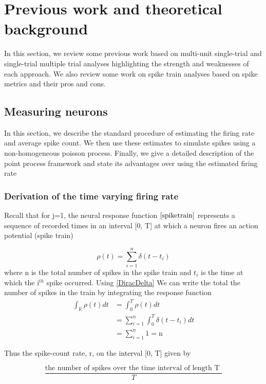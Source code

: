 
\section{Previous work and theoretical background}
In this section, we review some previous work based on multi-unit single-trial
and single-trial multiple trial analyses highlighting the strength and
weaknesses of each approach.
We also review some work on spike train analyses based on spike metrics
and their pros and cons.
\subsection{Measuring neurons}
In this section, we describe the standard procedure of estimating the 
firing rate and average spike count. We then use these estimates
to simulate spikes using a non-homogeneous poisson process.
Finally, we give a detailed description of the point process framework and 
state its advantages over using the estimated firing rate

\subsubsection{Derivation of the time varying firing rate}
Recall that for j=1, the neural response function $\eqref{spiketrain}$ represents a sequence of recorded times in an interval [0, T] at which a neuron fires an action potential (spike train)

\begin{equation}\label{response function}
 \rho(t) = \sum_{i=1}^{n} \delta(t-t_{i})  
\end{equation}
where n is the total number of spikes in the spike train and $t_{i}$ is the time at which the i$^{th}$ spike occurred. Using \eqref{DiracDelta}
We can write the total the number of spikes in the train by integrating the response function
\begin{align*}
\int_{\mathbb{R}}  \rho(t)  dt &=   \int_{0}^{T}  \rho(t)  dt\\
      &= \displaystyle  \sum_{i=1}^{n}    \int_{0}^{T}  \delta(t-t_{i}) dt\\
              & = \displaystyle  \sum_{i=1}^{n} 1 = \text{n}
\end{align*}


Thus the spike-count rate, r,  on the interval [0, T]  given by

\[ \dfrac{\text{the number of spikes over the time interval of length T }}{T} \]

